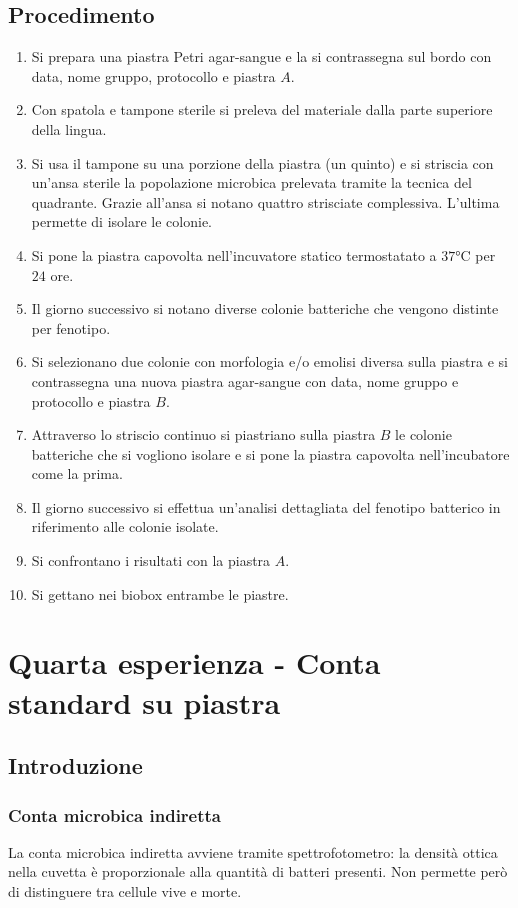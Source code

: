 		\subsection{Procedimento}
		\begin{enumerate}
			\item Si prepara una piastra Petri agar-sangue e la si contrassegna sul bordo con data, nome gruppo, protocollo e piastra $A$.
			\item Con spatola e tampone sterile si preleva del materiale dalla parte superiore della lingua.
			\item Si usa il tampone su una porzione della piastra (un quinto) e si striscia con un'ansa sterile la popolazione microbica prelevata tramite la tecnica del quadrante.
				Grazie all'ansa si notano quattro strisciate complessiva.
				L'ultima permette di isolare le colonie.
			\item Si pone la piastra capovolta nell'incuvatore statico termostatato a $37\si{\celsius}$ per $24$ ore.
			\item Il giorno successivo si notano diverse colonie batteriche che vengono distinte per fenotipo.
			\item Si selezionano due colonie con morfologia e/o emolisi diversa sulla piastra e si contrassegna una nuova piastra agar-sangue con data, nome gruppo e protocollo e piastra $B$.
			\item Attraverso lo striscio continuo si piastriano sulla piastra $B$ le colonie batteriche che si vogliono isolare e si pone la piastra capovolta nell'incubatore come la prima.
			\item Il giorno successivo si effettua un'analisi dettagliata del fenotipo batterico in riferimento alle colonie isolate.
			\item Si confrontano i risultati con la piastra $A$.
			\item Si gettano nei biobox entrambe le piastre.
		\end{enumerate}
\section{Quarta esperienza - Conta standard su piastra}

	\subsection{Introduzione}

		\subsubsection{Conta microbica indiretta}
		La conta microbica indiretta avviene tramite spettrofotometro: la densit\`a ottica nella cuvetta \`e proporzionale alla quantit\`a di batteri presenti.
		Non permette per\`o di distinguere tra cellule vive e morte.

